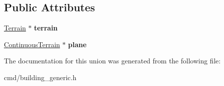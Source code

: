 \subsection*{Public Attributes}
\begin{DoxyCompactItemize}
\item 
\hyperlink{classTerrain}{Terrain} $\ast$ {\bfseries terrain}\hypertarget{unionBuilding_1_1Buildingparent_a380a5fb4911e32740972f04118ddfa08}{}\label{unionBuilding_1_1Buildingparent_a380a5fb4911e32740972f04118ddfa08}

\item 
\hyperlink{classContinuousTerrain}{Continuous\+Terrain} $\ast$ {\bfseries plane}\hypertarget{unionBuilding_1_1Buildingparent_a9c0d20d0f240e8b1ec238f1c71078d7b}{}\label{unionBuilding_1_1Buildingparent_a9c0d20d0f240e8b1ec238f1c71078d7b}

\end{DoxyCompactItemize}


The documentation for this union was generated from the following file\+:\begin{DoxyCompactItemize}
\item 
cmd/building\+\_\+generic.\+h\end{DoxyCompactItemize}
